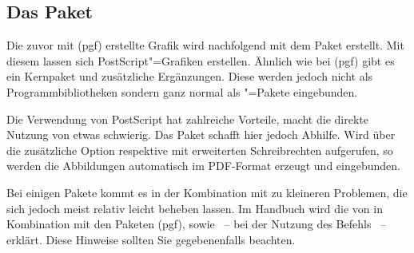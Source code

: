 \documentclass[%
  english,ngerman,%
  geometry=no,DIV=12,automark,%
]{tudscrartcl}
\begin{document}
\subsection{Das Paket }
Die zuvor mit (pgf) erstellte Grafik wird nachfolgend mit dem 
Paket  erstellt. Mit diesem lassen sich PostScript"=Grafiken 
erstellen. Ähnlich wie bei (pgf) gibt es ein Kernpaket und 
zusätzliche Ergänzungen. Diese werden jedoch nicht als Programmbibliotheken 
sondern ganz normal als "=Pakete eingebunden.
%
\begin{Hint}
\usepackage{pstricks}
\usepackage{pst-node}
\end{Hint}
%
Die Verwendung von PostScript hat zahlreiche Vorteile, macht die direkte 
Nutzung von  etwas schwierig. Das Paket  
schafft hier jedoch Abhilfe. Wird  über die zusätzliche Option 
 respektive  mit erweiterten 
Schreibrechten aufgerufen, so werden die Abbildungen automatisch im PDF-Format 
erzeugt und eingebunden.
%
\begin{Hint}
\usepackage{auto-pst-pdf}
\end{Hint}
%
Bei einigen Pakete kommt es in der Kombination mit  zu 
kleineren Problemen, die sich jedoch meist relativ leicht beheben lassen. Im 
Handbuch wird die  
von  in Kombination mit den Paketen (pgf), 
 sowie ~-- bei der Nutzung des Befehls 
~-- erklärt. Diese Hinweise sollten Sie gegebenenfalls beachten.
\end{document}
